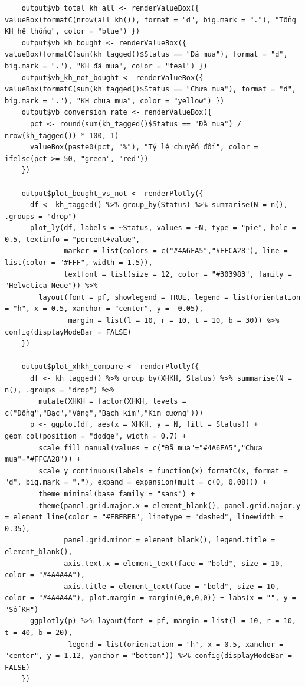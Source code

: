 \documentclass[12pt, a4paper]{article}
\begin{document}
\begin{lstlisting}
    output$vb_total_kh_all <- renderValueBox({ valueBox(formatC(nrow(all_kh()), format = "d", big.mark = "."), "Tổng KH hệ thống", color = "blue") })
    output$vb_kh_bought <- renderValueBox({ valueBox(formatC(sum(kh_tagged()$Status == "Đã mua"), format = "d", big.mark = "."), "KH đã mua", color = "teal") })
    output$vb_kh_not_bought <- renderValueBox({ valueBox(formatC(sum(kh_tagged()$Status == "Chưa mua"), format = "d", big.mark = "."), "KH chưa mua", color = "yellow") })
    output$vb_conversion_rate <- renderValueBox({
      pct <- round(sum(kh_tagged()$Status == "Đã mua") / nrow(kh_tagged()) * 100, 1)
      valueBox(paste0(pct, "%"), "Tỷ lệ chuyển đổi", color = ifelse(pct >= 50, "green", "red"))
    })

    output$plot_bought_vs_not <- renderPlotly({
      df <- kh_tagged() %>% group_by(Status) %>% summarise(N = n(), .groups = "drop")
      plot_ly(df, labels = ~Status, values = ~N, type = "pie", hole = 0.5, textinfo = "percent+value",
              marker = list(colors = c("#4A6FA5","#FFCA28"), line = list(color = "#FFF", width = 1.5)),
              textfont = list(size = 12, color = "#303983", family = "Helvetica Neue")) %>%
        layout(font = pf, showlegend = TRUE, legend = list(orientation = "h", x = 0.5, xanchor = "center", y = -0.05),
               margin = list(l = 10, r = 10, t = 10, b = 30)) %>% config(displayModeBar = FALSE)
    })

    output$plot_xhkh_compare <- renderPlotly({
      df <- kh_tagged() %>% group_by(XHKH, Status) %>% summarise(N = n(), .groups = "drop") %>%
        mutate(XHKH = factor(XHKH, levels = c("Đồng","Bạc","Vàng","Bạch kim","Kim cương")))
      p <- ggplot(df, aes(x = XHKH, y = N, fill = Status)) + geom_col(position = "dodge", width = 0.7) +
        scale_fill_manual(values = c("Đã mua"="#4A6FA5","Chưa mua"="#FFCA28")) +
        scale_y_continuous(labels = function(x) formatC(x, format = "d", big.mark = "."), expand = expansion(mult = c(0, 0.08))) +
        theme_minimal(base_family = "sans") +
        theme(panel.grid.major.x = element_blank(), panel.grid.major.y = element_line(color = "#EBEBEB", linetype = "dashed", linewidth = 0.35),
              panel.grid.minor = element_blank(), legend.title = element_blank(),
              axis.text.x = element_text(face = "bold", size = 10, color = "#4A4A4A"),
              axis.title = element_text(face = "bold", size = 10, color = "#4A4A4A"), plot.margin = margin(0,0,0,0)) + labs(x = "", y = "Số KH")
      ggplotly(p) %>% layout(font = pf, margin = list(l = 10, r = 10, t = 40, b = 20),
               legend = list(orientation = "h", x = 0.5, xanchor = "center", y = 1.12, yanchor = "bottom")) %>% config(displayModeBar = FALSE)
    })


\end{lstlisting}
\end{document}
